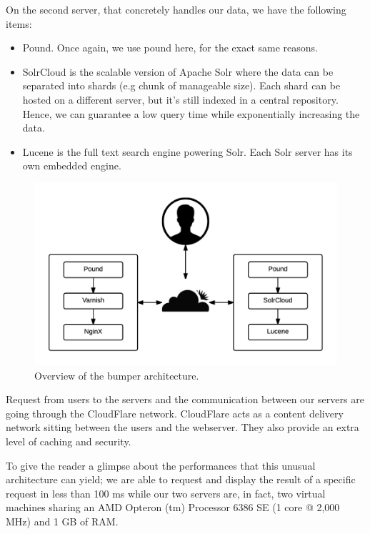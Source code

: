 On the second server, that concretely handles our data, we have the following items:

\begin{itemize}
	\item Pound. Once again, we use pound here, for the exact same reasons.
	\item SolrCloud is the scalable version of Apache Solr where the data can be separated into shards (e.g chunk of manageable size). Each shard can be hosted on a different server, but it's still indexed in a central repository. Hence, we can guarantee a low query time while exponentially increasing the data.
	\item Lucene is the full text search engine powering Solr. Each Solr server has its own embedded engine.
\end{itemize}

\begin{figure}[h!]
  \centering
    \includegraphics{media/bumper-arch.png}
    \caption{Overview of the bumper architecture.
    \label{fig:bumper-arch}}
\end{figure}

Request from users to the servers and the communication between our servers are going through the CloudFlare network.
CloudFlare acts as a content delivery network sitting between the users and the webserver.
They also provide an extra level of caching and security.

To give the reader a glimpse about the performances that this unusual architecture can yield; we are able to request and display the result of a specific request in less than 100 ms while our two servers are, in fact, two virtual machines sharing an AMD Opteron (tm) Processor 6386 SE (1 core @ 2,000 MHz) and 1 GB of RAM.


